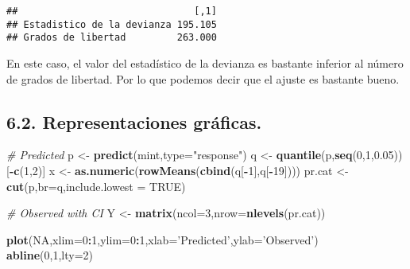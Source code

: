 \documentclass[]{article}
\newenvironment{Shaded}{\begin{snugshade}}{\end{snugshade}}
\newcommand{\KeywordTok}[1]{\textcolor[rgb]{0.13,0.29,0.53}{\textbf{#1}}}
\newcommand{\DataTypeTok}[1]{\textcolor[rgb]{0.13,0.29,0.53}{#1}}
\newcommand{\DecValTok}[1]{\textcolor[rgb]{0.00,0.00,0.81}{#1}}
\newcommand{\FloatTok}[1]{\textcolor[rgb]{0.00,0.00,0.81}{#1}}
\newcommand{\StringTok}[1]{\textcolor[rgb]{0.31,0.60,0.02}{#1}}
\newcommand{\CommentTok}[1]{\textcolor[rgb]{0.56,0.35,0.01}{\textit{#1}}}
\newcommand{\OtherTok}[1]{\textcolor[rgb]{0.56,0.35,0.01}{#1}}
\newcommand{\OperatorTok}[1]{\textcolor[rgb]{0.81,0.36,0.00}{\textbf{#1}}}
\newcommand{\NormalTok}[1]{#1}
\begin{document}
\begin{verbatim}
##                               [,1]
## Estadistico de la devianza 195.105
## Grados de libertad         263.000
\end{verbatim}

En este caso, el valor del estadístico de la devianza es bastante
inferior al número de grados de libertad. Por lo que podemos decir que
el ajuste es bastante bueno.

\subsection{6.2. Representaciones
gráficas.}\label{representaciones-graficas.}

\begin{Shaded}
\begin{Highlighting}[]
\CommentTok{# Predicted}
\NormalTok{p <-}\StringTok{ }\KeywordTok{predict}\NormalTok{(mint,}\DataTypeTok{type=}\StringTok{"response"}\NormalTok{)}
\NormalTok{q <-}\StringTok{ }\KeywordTok{quantile}\NormalTok{(p,}\KeywordTok{seq}\NormalTok{(}\DecValTok{0}\NormalTok{,}\DecValTok{1}\NormalTok{,}\FloatTok{0.05}\NormalTok{))[}\OperatorTok{-}\KeywordTok{c}\NormalTok{(}\DecValTok{1}\NormalTok{,}\DecValTok{2}\NormalTok{)]}
\NormalTok{x <-}\StringTok{ }\KeywordTok{as.numeric}\NormalTok{(}\KeywordTok{rowMeans}\NormalTok{(}\KeywordTok{cbind}\NormalTok{(q[}\OperatorTok{-}\DecValTok{1}\NormalTok{],q[}\OperatorTok{-}\DecValTok{19}\NormalTok{])))}
\NormalTok{pr.cat <-}\StringTok{ }\KeywordTok{cut}\NormalTok{(p,}\DataTypeTok{br=}\NormalTok{q,}\DataTypeTok{include.lowest =} \OtherTok{TRUE}\NormalTok{)}

\CommentTok{# Observed with CI}
\NormalTok{Y <-}\StringTok{ }\KeywordTok{matrix}\NormalTok{(}\DataTypeTok{ncol=}\DecValTok{3}\NormalTok{,}\DataTypeTok{nrow=}\KeywordTok{nlevels}\NormalTok{(pr.cat))}

\KeywordTok{plot}\NormalTok{(}\OtherTok{NA}\NormalTok{,}\DataTypeTok{xlim=}\DecValTok{0}\OperatorTok{:}\DecValTok{1}\NormalTok{,}\DataTypeTok{ylim=}\DecValTok{0}\OperatorTok{:}\DecValTok{1}\NormalTok{,}\DataTypeTok{xlab=}\StringTok{'Predicted'}\NormalTok{,}\DataTypeTok{ylab=}\StringTok{'Observed'}\NormalTok{)}
\KeywordTok{abline}\NormalTok{(}\DecValTok{0}\NormalTok{,}\DecValTok{1}\NormalTok{,}\DataTypeTok{lty=}\DecValTok{2}\NormalTok{)}


\end{Highlighting}
\end{Shaded}
\end{document}
